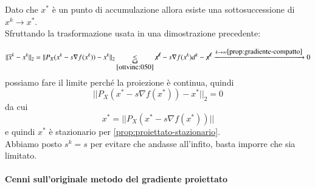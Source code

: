 \begin{thproof}
Dato che $x^{*}$ è un punto di accumulazione allora esiste una
sottosuccessione di $x^k \rightarrow x^{*}$.\\
Sfruttando la trasformazione usata in una dimostrazione precedente:

$$ || \overline{x}^k - x^k ||_2 = 
|| P_X (x^k - s \nabla f(x^k)) - x^k ||_2 \underbracket{\leq}_{\ref{ottvinc:050}}
\cancel{x^k} - s \nabla f(x^k) d^k - \cancel{x^k} 
\xrightarrow{k \to \infty \ref{prop:gradiente-compatto}} 0 $$ 
possiamo fare il limite perché la proiezione è continua, quindi
$$ || P_X (x^{*} - s \nabla f(x^{*})) - x^{*} ||_2 = 0 $$ 
da cui 
$$ x^{*} = || P_X (x^{*} - s \nabla f(x^{*})) || $$
e quindi $x^{*}$ è stazionario per \ref{prop:proiettato-stazionario}.\\

Abbiamo posto $s^k=s$ per evitare che andasse all'infito, basta
imporre che sia limitato.


\end{thproof}

\paragraph{Cenni sull'originale metodo del gradiente proiettato}

\begin{center}
\end{center}


